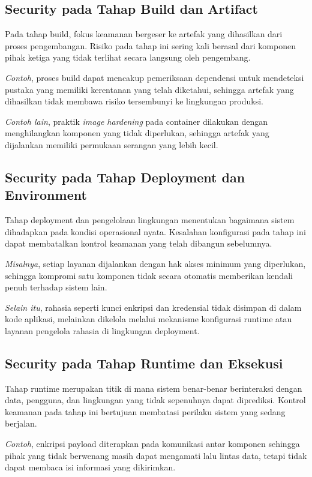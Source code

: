\subsection{Security pada Tahap Build dan Artifact}

Pada tahap build, fokus keamanan bergeser ke artefak yang dihasilkan dari proses pengembangan. Risiko pada tahap ini sering kali berasal dari komponen pihak ketiga yang tidak terlihat secara langsung oleh pengembang.

\emph{Contoh}, proses build dapat mencakup pemeriksaan dependensi untuk mendeteksi pustaka yang memiliki kerentanan yang telah diketahui, sehingga artefak yang dihasilkan tidak membawa risiko tersembunyi ke lingkungan produksi.

\emph{Contoh lain}, praktik \emph{image hardening} pada container dilakukan dengan menghilangkan komponen yang tidak diperlukan, sehingga artefak yang dijalankan memiliki permukaan serangan yang lebih kecil.

\subsection{Security pada Tahap Deployment dan Environment}

Tahap deployment dan pengelolaan lingkungan menentukan bagaimana sistem dihadapkan pada kondisi operasional nyata. Kesalahan konfigurasi pada tahap ini dapat membatalkan kontrol keamanan yang telah dibangun sebelumnya.

\emph{Misalnya}, setiap layanan dijalankan dengan hak akses minimum yang diperlukan, sehingga kompromi satu komponen tidak secara otomatis memberikan kendali penuh terhadap sistem lain.

\emph{Selain itu}, rahasia seperti kunci enkripsi dan kredensial tidak disimpan di dalam kode aplikasi, melainkan dikelola melalui mekanisme konfigurasi runtime atau layanan pengelola rahasia di lingkungan deployment.

\subsection{Security pada Tahap Runtime dan Eksekusi}

Tahap runtime merupakan titik di mana sistem benar-benar berinteraksi dengan data, pengguna, dan lingkungan yang tidak sepenuhnya dapat diprediksi. Kontrol keamanan pada tahap ini bertujuan membatasi perilaku sistem yang sedang berjalan.

\emph{Contoh}, enkripsi payload diterapkan pada komunikasi antar komponen sehingga pihak yang tidak berwenang masih dapat mengamati lalu lintas data, tetapi tidak dapat membaca isi informasi yang dikirimkan.


